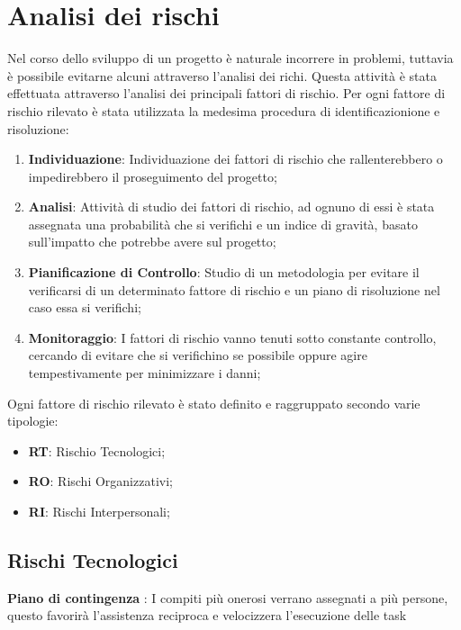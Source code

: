 \section{Analisi dei rischi}
	Nel corso dello sviluppo di un progetto è naturale incorrere in problemi, tuttavia è possibile evitarne alcuni attraverso l'analisi dei richi. Questa attività è stata effettuata attraverso l'analisi dei principali fattori di rischio. Per ogni fattore di rischio rilevato è stata utilizzata la medesima procedura di identificazionione e risoluzione:
	\begin{enumerate}
		\item \textbf{Individuazione}: Individuazione dei fattori di rischio che rallenterebbero o impedirebbero il proseguimento del progetto;
		\item \textbf{Analisi}: Attività di studio dei fattori di rischio, ad ognuno di essi è stata assegnata una probabilità che si verifichi e un indice di gravità, basato sull'impatto che potrebbe avere sul progetto;
		\item \textbf{Pianificazione di Controllo}: Studio di un metodologia per evitare il verificarsi di un determinato fattore di rischio e un piano di risoluzione nel caso essa si verifichi;
		\item \textbf{Monitoraggio}: I fattori di rischio vanno tenuti sotto constante controllo, cercando di evitare che si verifichino se possibile oppure agire tempestivamente per minimizzare i danni;
	\end{enumerate}
	Ogni fattore di rischio rilevato è stato definito e raggruppato secondo varie tipologie:
	\begin{itemize}
		\item \textbf{RT}: Rischio Tecnologici;
		\item \textbf{RO}: Rischi Organizzativi;
		\item \textbf{RI}: Rischi Interpersonali;
	\end{itemize}
	\subsection{Rischi Tecnologici}
	\def\productquality{
    		{
        		Inesperienza
			Tecnologica
			RT1,
        		La maggior parte delle tecnologie richieste nello sviluppo del progetto sono nuove per molti componenti del team, 
        		Il responsabile dovrà rilevare conoscenze e lacune dei vari componenti del team provando ad indicare una via ottimale per risolvere la mancanza di conoscenze,
        		Occorrenza: Alta 
			Pericolosità: Alta
    		},
	}
	
	\textbf{Piano di contingenza} : I compiti più onerosi verrano assegnati a più persone, questo favorirà l'assistenza reciproca e velocizzera l'esecuzione delle task
	\pagebreak
